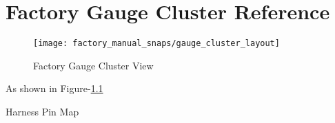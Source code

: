 \chapter{Factory Gauge Cluster Reference}
\begin{figure}[h]
  \texttt{[image: factory\_manual\_snaps/gauge\_cluster\_layout]}
  \centering
  \caption{Factory Gauge Cluster View}
  \label{fig:factory_gauge_cluster_view}
\end{figure}


As shown in Figure-\ref{fig:factory_gauge_cluster_view}

\begin{table}
\caption{Harness Pin Map}
\label{tab:harnesspinmap}
\vspace{10pt}
\centering
{}
\par
\end{table}

